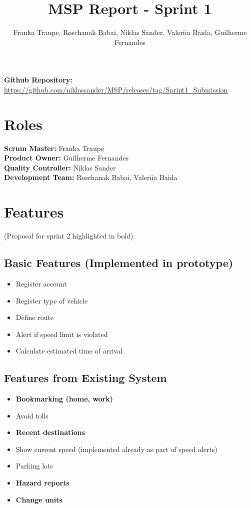 \documentclass{article}
\title{MSP Report - Sprint 1}
\author{Franka Traupe, Roschanak Babai, Niklas Sander, Valeriia Baida, Guilherme Fernandes}
\date{}
\begin{document}
\maketitle

\textbf{Github Repository:} \url{https://github.com/niklassander/MSP/releases/tag/Sprint1_Submission}

\section*{Roles}
\textbf{Scrum Master:} Franka Traupe\\
\textbf{Product Owner:} Guilherme Fernandes\\
\textbf{Quality Controller:} Niklas Sander\\
\textbf{Development Team:} Roschanak Babai, Valeriia Baida

\section*{Features}
(Proposal for sprint 2 highlighted in bold)

\subsection*{Basic Features (Implemented in prototype)}
\begin{itemize}
    \item Register account
    \item Register type of vehicle
    \item Define route
    \item Alert if speed limit is violated
    \item Calculate estimated time of arrival
\end{itemize}

\subsection*{Features from Existing System}
\begin{itemize}
    \item \textbf{Bookmarking (home, work)}
    \item Avoid tolls
    \item \textbf{Recent destinations}
    \item Show current speed (implemented already as part of speed alerts)
    \item Parking lots
    \item \textbf{Hazard reports}
    \item \textbf{Change units}
\end{itemize}
\end{document}

